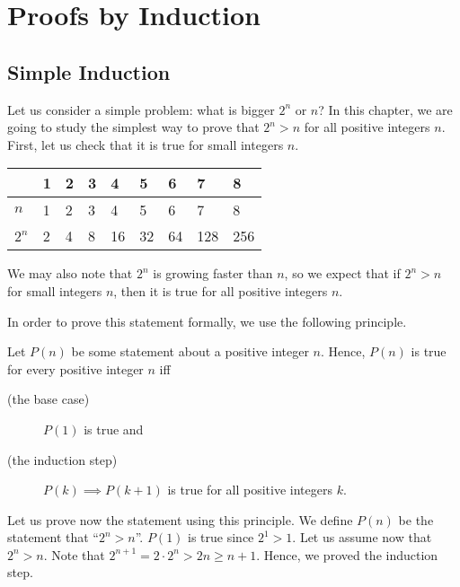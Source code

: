 \chapter{Proofs by Induction}
\label{chapter:induction}
\section{Simple Induction}

Let us consider a simple problem: what is bigger $2^n$ or $n$? In this chapter,
we are going to study the simplest way to prove that $2^n > n$ for all positive
integers $n$. First, let us check that it is true for small integers $n$.
\begin{center}
  \begin{tabular}{l l l  l  l  l  l  l  l}
    \toprule
          & 1 & 2 & 3 & 4  & 5  & 6  & 7   & 8   \\
    \midrule
    $n$   & 1 & 2 & 3 & 4  & 5  & 6  & 7   & 8   \\
    $2^n$ & 2 & 4 & 8 & 16 & 32 & 64 & 128 & 256 \\
    \bottomrule
  \end{tabular}
\end{center}
We may also note that $2^n$ is growing faster than $n$, so we expect that if
$2^n > n$ for small integers $n$, then it is true for all positive integers $n$.

In order to prove this statement formally, we use the following principle.
\begin{principle}
  Let $P(n)$ be some statement about a positive integer $n$.
  Hence, $P(n)$ is true for every positive integer $n$ iff
  \begin{description}
    \item [(the base case)] $P(1)$ is true and
    \item [(the induction step)] $P(k) \implies P(k + 1)$ is true
      for all positive integers $k$.
  \end{description}
\end{principle}

Let us prove now the statement using this principle.
We define $P(n)$ be the statement that ``$2^n > n$''.
$P(1)$ is true since $2^1 > 1$. Let us assume now that $2^n > n$. Note that
$2^{n + 1} = 2 \cdot 2^n > 2n \ge n + 1$. Hence, we proved the induction step.

